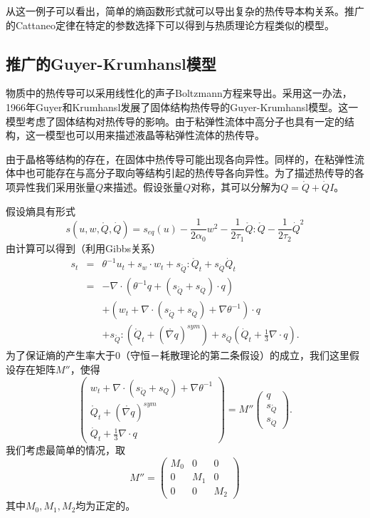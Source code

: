 从这一例子可以看出，简单的熵函数形式就可以导出复杂的热传导本构关系。推广的Cattaneo定律在特定的参数选择下可以得到与热质理论方程类似的模型。

\subsection{推广的Guyer-Krumhansl模型}
物质中的热传导可以采用线性化的声子Boltzmann方程来导出。采用这一办法，1966年Guyer和Krumhansl发展了固体结构热传导的Guyer-Krumhansl模型\cite{guyer1966solution}。这一模型考虑了固体结构对热传导的影响。由于粘弹性流体中高分子也具有一定的结构，这一模型也可以用来描述液晶等粘弹性流体的热传导\cite{van2002weakly,van2005exploiting}。

由于晶格等结构的存在，在固体中热传导可能出现各向异性。同样的，在粘弹性流体中也可能存在与高分子取向等结构引起的热传导各向异性。为了描述热传导的各项异性我们采用张量$Q$来描述。假设张量${Q}$对称，其可以分解为${Q}=\mathring{{Q}}+\dot{Q}{I}$。

假设熵具有形式
\begin{equation*}
s(u,{w},\mathring{{Q}},\dot{Q})=s_{eq}(u)-\frac{1}{2 \alpha_0}{w}^2-\frac{1}{2\tau_1} {\mathring{{Q}}}:{\mathring{{Q}}}-\frac{1}{2\tau_2}\dot{Q}^2
\end{equation*}
由计算可以得到（利用Gibbs关系）
\begin{eqnarray*}
s_t &=& \theta^{-1} u_t +s_{w} \cdot {w}_t + s_{\mathring{{Q}}}:\mathring{{Q}}_t+s_{\dot{Q}} \dot{Q}_t \\
    &=& -\nabla \cdot (\theta^{-1} {q}+ (s_{\mathring{{Q}}}+s_{\dot{Q}}) \cdot {q})\\
    	&&+({w}_t+\nabla \cdot (s_{\mathring{{Q}}}+s_{\dot{Q}})+\nabla \theta^{-1}) \cdot {q} \\
&& +s_{\mathring{{Q}}}:(\mathring{{Q}}_t+(\mathring{\nabla {q}})^{sym})+s_{\dot{Q}}(\dot{Q}_t+\frac{1}{3}\nabla \cdot {q}).
\end{eqnarray*}
为了保证熵的产生率大于0（守恒－耗散理论的第二条假设）的成立，我们这里假设存在矩阵$M''$，使得
\begin{equation*}
\left( \begin{array}{ll} {w}_t+\nabla \cdot (s_{\mathring{{Q}}}+s_Q)+\nabla \theta^{-1} \\ \mathring{{Q}}_t+(\mathring{\nabla {q}})^{sym} \\ \dot{Q}_t+\frac{1}{3} \nabla \cdot {q} \end{array} \right) = M'' \left( \begin{array}{l} {q} \\ s_{\mathring{{Q}}} \\s_{\dot{Q}} \end{array} \right).
\end{equation*}
我们考虑最简单的情况，取
\begin{equation*}
	M''=\left( \begin{array}{lll} M_0 & 0 & 0 \\0 & M_1 & 0 \\0 & 0 & M_2 \end{array} \right)
\end{equation*}
其中$M_0,M_1,M_2$均为正定的。


